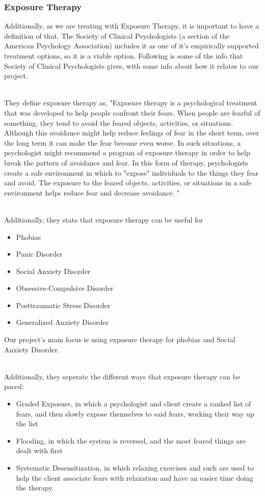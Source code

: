 \documentclass[a4paper,10pt]{article}
\begin{document}
\subsubsection{Exposure Therapy}
Additionally, as we are treating with Exposure Therapy, it is important to have a definition of that.  The Society of Clinical Psychologists (a section of the American Psychology 
Association) includes it as one of it's empirically supported treatment options, so it is a viable option.  Following is some of the info that Society of Clinical Psychologists gives,
with some info about how it relates to our project.
\par~\\ 
They define exposure therapy as, "Exposure therapy is a psychological treatment that was developed to help people confront their fears. When people
are fearful of something, they tend to avoid the feared objects, activities, or situations. Although this avoidance might help reduce feelings of fear in the short term, over the long 
term it can make the fear become even worse. In such situations, a psychologist might recommend a program of exposure therapy in order to help break the pattern of avoidance and fear.
In this form of therapy, psychologists create a safe environment in which to "expose" individuals to the things they fear and avoid. The exposure to the feared objects, activities, or 
situations in a safe environment helps reduce fear and decrease avoidance. "
\par~\\ 
Additionally, they state that exposure therapy can be useful for 
\begin{itemize}
	\item Phobias
	\item Panic Disorder
	\item Social Anxiety Disorder
	\item Obsessive-Compulsive Disorder
	\item Posttraumatic Stress Disorder
	\item Generalized Anxiety Disorder 
\end{itemize}
Our project's main focus is using exposure therapy for phobias and Social Anxiety Disorder.  
\par~\\ 
Additionally, they seperate the different ways that exposure therapy can be paced:
\begin{itemize}
	\item Graded Exposure, in which a psychologist and client create a ranked list of fears, and then slowly expose themselves to said fears, working their way up the list
	\item Flooding, in which the system is reversed, and the most feared things are dealt with first
	\item Systematic Desensitization, in which relaxing exercises and such are used to help the client associate fears with relaxation and have an easier time doing the therapy.
\end{itemize}
\end{document}
